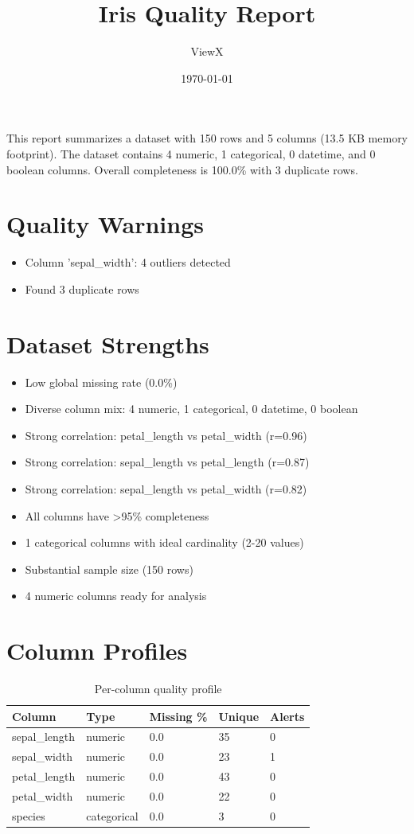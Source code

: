 \documentclass{article}%
\title{Iris Quality Report}%
\author{ViewX}%
\date{\today}%
\begin{document}
%
\normalsize%
\pgfplotsset{compat=1.18}%
\maketitle%
This report summarizes a dataset with 150 rows and 5 columns (13.5 KB memory footprint). The dataset contains 4 numeric, 1 categorical, 0 datetime, and 0 boolean columns. Overall completeness is 100.0\% with 3 duplicate rows.%
%
\section{Quality Warnings}%
\label{sec:QualityWarnings}%
\begin{itemize}%
\item%
Column 'sepal\_width': 4 outliers detected%
\item%
Found 3 duplicate rows%
\end{itemize}

%
\section{Dataset Strengths}%
\label{sec:DatasetStrengths}%
\begin{itemize}%
\item%
Low global missing rate (0.0\%)%
\item%
Diverse column mix: 4 numeric, 1 categorical, 0 datetime, 0 boolean%
\item%
Strong correlation: petal\_length vs petal\_width (r=0.96)%
\item%
Strong correlation: sepal\_length vs petal\_length (r=0.87)%
\item%
Strong correlation: sepal\_length vs petal\_width (r=0.82)%
\item%
All columns have >95\% completeness%
\item%
1 categorical columns with ideal cardinality (2{-}20 values)%
\item%
Substantial sample size (150 rows)%
\item%
4 numeric columns ready for analysis%
\end{itemize}

%
\section{Column Profiles}%
\label{sec:ColumnProfiles}%
\begin{table}[H]\centering
\caption{Per{-}column quality profile}
\begin{tabular}{l | l | l | l | l}\hline
Column & Type & Missing \% & Unique & Alerts\\ \hline
sepal\_length & numeric & 0.0 & 35 & 0\\ \hline
sepal\_width & numeric & 0.0 & 23 & 1\\ \hline
petal\_length & numeric & 0.0 & 43 & 0\\ \hline
petal\_width & numeric & 0.0 & 22 & 0\\ \hline
species & categorical & 0.0 & 3 & 0\\ \hline
\end{tabular}\end{table}
\end{document}
